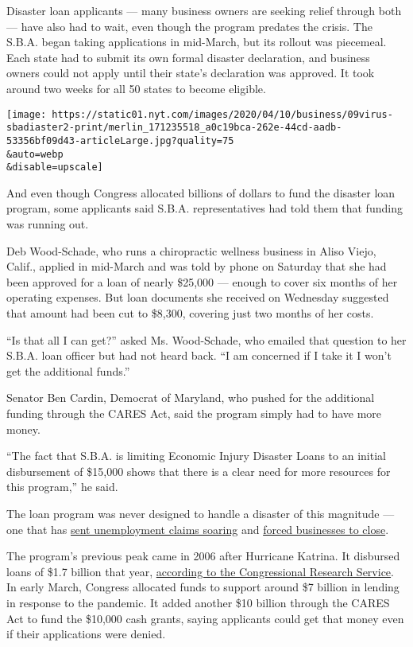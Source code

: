 Disaster loan applicants --- many business owners are seeking relief
through both --- have also had to wait, even though the program predates
the crisis. The S.B.A. began taking applications in mid-March, but its
rollout was piecemeal. Each state had to submit its own formal disaster
declaration, and business owners could not apply until their state's
declaration was approved. It took around two weeks for all 50 states to
become eligible.

\texttt{[image: https://static01.nyt.com/images/2020/04/10/business/09virus-sbadiaster2-print/merlin\_171235518\_a0c19bca-262e-44cd-aadb-53356bf09d43-articleLarge.jpg?quality=75\\\&auto=webp\\\&disable=upscale]}

And even though Congress allocated billions of dollars to fund the
disaster loan program, some applicants said S.B.A. representatives had
told them that funding was running out.

Deb Wood-Schade, who runs a chiropractic wellness business in Aliso
Viejo, Calif., applied in mid-March and was told by phone on Saturday
that she had been approved for a loan of nearly \$25,000 --- enough to
cover six months of her operating expenses. But loan documents she
received on Wednesday suggested that amount had been cut to \$8,300,
covering just two months of her costs.

``Is that all I can get?'' asked Ms. Wood-Schade, who emailed that
question to her S.B.A. loan officer but had not heard back. ``I am
concerned if I take it I won't get the additional funds.''

Senator Ben Cardin, Democrat of Maryland, who pushed for the additional
funding through the CARES Act, said the program simply had to have more
money.

``The fact that S.B.A. is limiting Economic Injury Disaster Loans to an
initial disbursement of \$15,000 shows that there is a clear need for
more resources for this program,'' he said.

The loan program was never designed to handle a disaster of this
magnitude --- one that has
\href{https://www.nytimes.com/2020/04/09/business/economy/unemployment-claim-numbers-coronavirus.html}{sent
unemployment claims soaring} and
\href{https://www.nytimes.com/2020/04/06/business/economy/coronavirus-economy.html}{forced
businesses to close}.

The program's previous peak came in 2006 after Hurricane Katrina. It
disbursed loans of \$1.7 billion that year,
\href{https://fas.org/sgp/crs/misc/R43846.pdf}{according to the
Congressional Research Service}. In early March, Congress allocated
funds to support around \$7 billion in lending in response to the
pandemic. It added another \$10 billion through the CARES Act to fund
the \$10,000 cash grants, saying applicants could get that money even if
their applications were denied.

